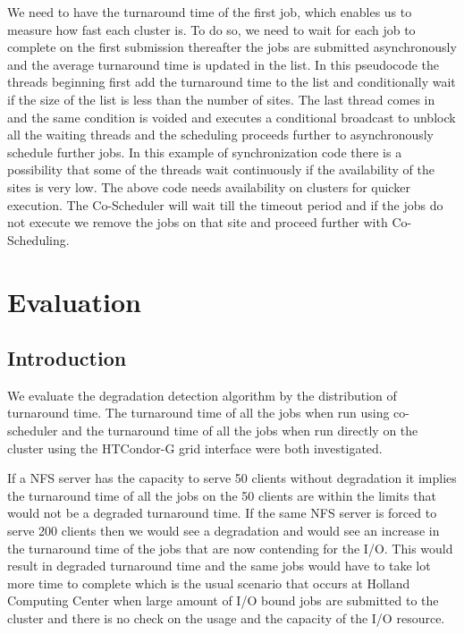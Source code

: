 \documentclass[ms,electronic,double]{nuthesis}
\begin{document}
We need to have the turnaround time of the first job,  which enables us to measure 
how fast each cluster is. To do so, we need to wait for each job to complete on 
the first submission thereafter the jobs are submitted asynchronously and the 
average turnaround time is updated in the list. In this pseudocode the threads 
beginning first add the turnaround time to the list and conditionally wait if 
the size of the list is less than the number of sites. The last thread comes in 
and the same condition is voided and executes a conditional broadcast to unblock 
all the waiting threads and the scheduling proceeds further to asynchronously schedule further 
jobs.
In this example of synchronization code there is a possibility that some of the 
threads wait continuously if the availability of the sites is very low. The 
above code needs availability on clusters for quicker execution. The 
Co-Scheduler will wait till the timeout period and if the jobs do not execute we 
remove the jobs on that site and proceed further with Co-Scheduling.
\chapter{Evaluation}

\section{Introduction}
We evaluate the degradation detection algorithm by the distribution of turnaround time. The turnaround 
time of all the jobs when run using co-scheduler and the turnaround time of all 
the jobs when run directly on the cluster using the HTCondor-G grid interface were both investigated.

If a NFS server has the capacity to serve 50 clients without degradation it
implies the turnaround time of all the jobs on the 50 clients are within the 
limits that would not be a degraded turnaround time. If the same NFS server is forced to serve 200 
clients then we would see a degradation and would see an increase in the turnaround time of the jobs
that are now contending for the I/O. This would result in degraded turnaround time and 
the same jobs would have to take lot more time to complete which is the usual 
scenario that occurs at Holland Computing Center when large amount of I/O bound 
jobs are submitted to the cluster and there is no check on the usage and the 
capacity of the I/O resource.
\end{document}
